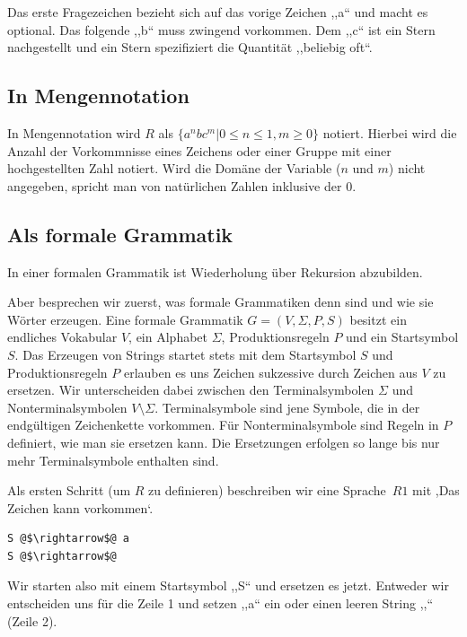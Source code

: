 Das erste Fragezeichen bezieht sich auf das vorige Zeichen ,,a`` und macht es optional. Das folgende ,,b`` muss zwingend vorkommen. Dem ,,c`` ist ein Stern nachgestellt und ein Stern spezifiziert die Quantität ,,beliebig oft``.

\subsection{In Mengennotation}
%
In Mengennotation wird $R$ als $\{a^n b c^m | 0\leq n\leq 1, m \geq 0\}$ notiert. Hierbei wird die Anzahl der Vorkommnisse eines Zeichens oder einer Gruppe mit einer hochgestellten Zahl notiert. Wird die Domäne der Variable ($n$ und $m$) nicht angegeben, spricht man von natürlichen Zahlen inklusive der 0.

\subsection{Als formale Grammatik}
%
In einer formalen Grammatik ist Wiederholung über Rekursion abzubilden.

Aber besprechen wir zuerst, was formale Grammatiken denn sind und wie sie Wörter erzeugen. Eine formale Grammatik $G = (V, \Sigma, P, S)$ besitzt ein endliches Vokabular $V$, ein Alphabet $\Sigma$, Produktionsregeln $P$ und ein Startsymbol $S$. Das Erzeugen von Strings startet stets mit dem Startsymbol $S$ und Produktionsregeln $P$ erlauben es uns Zeichen sukzessive durch Zeichen aus $V$ zu ersetzen. Wir unterscheiden dabei zwischen den Terminalsymbolen $\Sigma$ und Nonterminalsymbolen $V \setminus \Sigma$. Terminalsymbole sind jene Symbole, die in der endgültigen Zeichenkette vorkommen. Für Nonterminalsymbole sind Regeln in $P$ definiert, wie man sie ersetzen kann. Die Ersetzungen erfolgen so lange bis nur mehr Terminalsymbole enthalten sind.

Als ersten Schritt (um $R$ zu definieren) beschreiben wir eine Sprache~$R1$ mit ,Das Zeichen  kann vorkommen`.
\begin{lstlisting}
S @$\rightarrow$@ a
S @$\rightarrow$@
\end{lstlisting}

Wir starten also mit einem Startsymbol ,,S`` und ersetzen es jetzt. Entweder wir entscheiden uns für die Zeile 1 und setzen ,,a`` ein oder einen leeren String ,,`` (Zeile 2).

